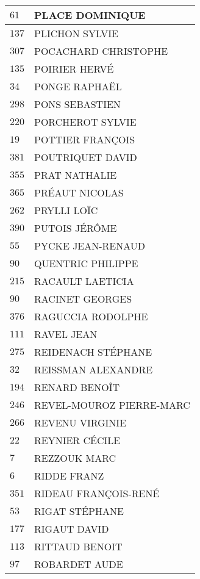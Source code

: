 \begin{xltabular}{\linewidth}{|l|X|}
    \hline
    $61$ & PLACE DOMINIQUE \\
    \hline
    $137$ & PLICHON SYLVIE \\
    \hline
    $307$ & POCACHARD CHRISTOPHE \\
    \hline
    $135$ & POIRIER HERVÉ \\
    \hline
    $34$ & PONGE RAPHAËL \\
    \hline
    $298$ & PONS SEBASTIEN \\
    \hline
    $220$ & PORCHEROT SYLVIE \\
    \hline
    $19$ & POTTIER FRANÇOIS \\
    \hline
    $381$ & POUTRIQUET DAVID \\
    \hline
    $355$ & PRAT NATHALIE \\
    \hline
    $365$ & PRÉAUT NICOLAS \\
    \hline
    $262$ & PRYLLI LOÏC \\
    \hline
    $390$ & PUTOIS JÉRÔME \\
    \hline
    $55$ & PYCKE JEAN-RENAUD \\
    \hline
    $90$ & QUENTRIC PHILIPPE \\
    \hline
    $215$ & RACAULT LAETICIA \\
    \hline
    $90$ & RACINET GEORGES \\
    \hline
    $376$ & RAGUCCIA RODOLPHE \\
    \hline
    $111$ & RAVEL JEAN \\
    \hline
    $275$ & REIDENACH STÉPHANE \\
    \hline
    $32$ & REISSMAN ALEXANDRE \\
    \hline
    $194$ & RENARD BENOÎT \\
    \hline
    $246$ & REVEL-MOUROZ PIERRE-MARC \\
    \hline
    $266$ & REVENU VIRGINIE \\
    \hline
    $22$ & REYNIER CÉCILE \\
    \hline
    $7$ & REZZOUK MARC \\
    \hline
    $6$ & RIDDE FRANZ \\
    \hline
    $351$ & RIDEAU FRANÇOIS-RENÉ \\
    \hline
    $53$ & RIGAT STÉPHANE \\
    \hline
    $177$ & RIGAUT DAVID \\
    \hline
    $113$ & RITTAUD BENOIT \\
    \hline
    $97$ & ROBARDET AUDE \\

\end{xltabular}

